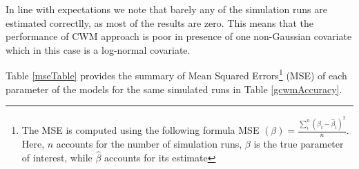 \documentclass[11pt,letterpaper]{article}
\numberwithin{equation}{section}
\numberwithin{equation}{section}
\numberwithin{equation}{section}
\begin{document}
In line with expectations we note that barely any of the simulation runs are estimated correctlly, as most of the results are zero. This means that the performance of CWM approach is poor in presence of one non-Gaussian covariate which in this case is a log-normal covariate. 

Table \ref{mseTable} provides the summary of Mean Squared Errors\footnote{The MSE is computed using the following formula MSE $(\beta) = \frac{\sum_i^n (\beta_i - \hat\beta_i ) ^2}{n}$. Here, $n$ accounts for the number of simulation runs, $\beta$ is the true parameter of interest, while $\hat{\beta}$ accounts for its estimate} (MSE) of each parameter of the models for the same simulated runs in Table \ref{gcwmAccuracy}.
\end{document}

